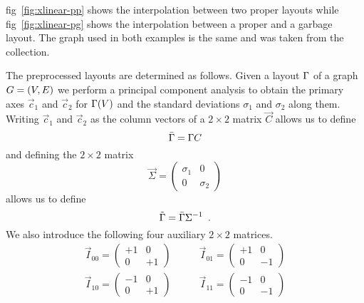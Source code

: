\documentclass{graphstudy}
\begin{document}
\Acl{fig}~\ref{fig:xlinear-pp} shows the  interpolation between two proper layouts while
\acl{fig}~\ref{fig:xlinear-pg} shows the  interpolation between a proper and a garbage layout.  The graph
used in both examples is the same and was taken from the  collection.

The preprocessed layouts are determined as follows.  Given a layout \(\Gamma\) of a graph \(G=(V,E)\) we perform a
principal component analysis to obtain the primary axes \(\vec{c}_1\) and \(\vec{c}_2\) for \(\Gamma(V)\) and the
standard deviations \(\sigma_1\) and \(\sigma_2\) along them.  Writing \(\vec{c}_1\) and \(\vec{c}_2\) as the column
vectors of a \(2\times2\) matrix \(\Vec{C}\) allows us to define
\begin{equation}
  \bar{\Gamma} = \Gamma \relax{C}
\end{equation}
and defining the \(2\times2\) matrix
\begin{equation}
  \Vec{\Sigma} = \left(\begin{array}{cc}\sigma_1&0\\0&\sigma_2\end{array}\right)
\end{equation}
allows us to define
\begin{equation}
  \tilde{\Gamma} = \bar{\Gamma} \relax{\Sigma}^{-1} \enspace.
\end{equation}
We also introduce the following four auxiliary \(2\times2\) matrices.
\begin{equation}
  \begin{split}
    \Vec{I}_{00} = \left(\begin{array}{cc}+1&0\\0&+1\end{array}\right)\qquad
   &\Vec{I}_{01} = \left(\begin{array}{cc}+1&0\\0&-1\end{array}\right)\\
    \Vec{I}_{10} = \left(\begin{array}{cc}-1&0\\0&+1\end{array}\right)\qquad
   &\Vec{I}_{11} = \left(\begin{array}{cc}-1&0\\0&-1\end{array}\right)
  \end{split}
\end{equation}
\end{document}
